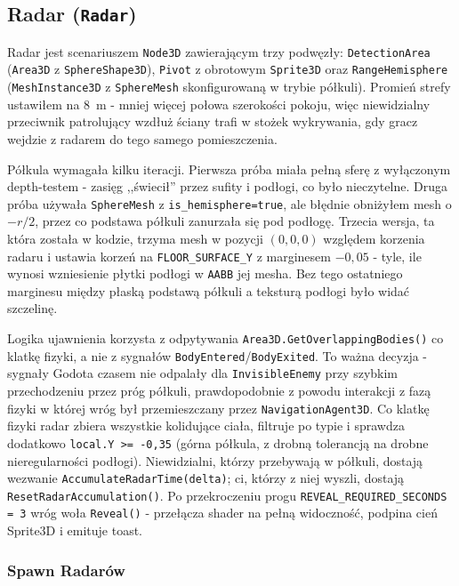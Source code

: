 \subsection{Radar (\texttt{Radar})}

Radar jest scenariuszem \texttt{Node3D} zawierającym trzy podwęzły: \texttt{DetectionArea} (\texttt{Area3D} z \texttt{SphereShape3D}), \texttt{Pivot} z obrotowym \texttt{Sprite3D} oraz \texttt{RangeHemisphere} (\texttt{MeshInstance3D} z \texttt{SphereMesh} skonfigurowaną w trybie półkuli). Promień strefy ustawiłem na 8~m - mniej więcej połowa szerokości pokoju, więc niewidzialny przeciwnik patrolujący wzdłuż ściany trafi w stożek wykrywania, gdy gracz wejdzie z radarem do tego samego pomieszczenia.

Półkula wymagała kilku iteracji. Pierwsza próba miała pełną sferę z wyłączonym depth-testem - zasięg ,,świecił'' przez sufity i podłogi, co było nieczytelne. Druga próba używała \texttt{SphereMesh} z \texttt{is\_hemisphere=true}, ale błędnie obniżyłem mesh o $-r/2$, przez co podstawa półkuli zanurzała się pod podłogę. Trzecia wersja, ta która została w kodzie, trzyma mesh w pozycji $(0,0,0)$ względem korzenia radaru i ustawia korzeń na \texttt{FLOOR\_SURFACE\_Y} z marginesem $-0{,}05$ - tyle, ile wynosi wzniesienie płytki podłogi w \texttt{AABB} jej mesha. Bez tego ostatniego marginesu między płaską podstawą półkuli a teksturą podłogi było widać szczelinę.

Logika ujawnienia korzysta z odpytywania \texttt{Area3D.\allowbreak Get\allowbreak Overlapping\allowbreak Bodies()} co klatkę fizyki, a nie z sygnałów \texttt{BodyEntered}/\texttt{BodyExited}. To ważna decyzja - sygnały Godota czasem nie odpalały dla \texttt{InvisibleEnemy} przy szybkim przechodzeniu przez próg półkuli, prawdopodobnie z powodu interakcji z fazą fizyki w której wróg był przemieszczany przez \texttt{NavigationAgent3D}. Co klatkę fizyki radar zbiera wszystkie kolidujące ciała, filtruje po typie i sprawdza dodatkowo \texttt{local.Y >= -0{,}35} (górna półkula, z drobną tolerancją na drobne nieregularności podłogi). Niewidzialni, którzy przebywają w półkuli, dostają wezwanie \texttt{Accumulate\allowbreak RadarTime(\allowbreak delta)}; ci, którzy z niej wyszli, dostają \texttt{Reset\allowbreak Radar\allowbreak Accumulation()}. Po przekroczeniu progu \texttt{REVEAL\_\allowbreak REQUIRED\_\allowbreak SECONDS = 3} wróg woła \texttt{Reveal()} - przełącza shader na pełną widoczność, podpina cień Sprite3D i emituje toast.

\subsubsection{Spawn Radarów}

